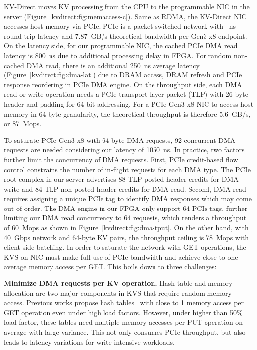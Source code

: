 KV-Direct moves KV processing from the CPU to the programmable NIC in the server (Figure~\ref{kvdirect:fig:memaccess-c}).
Same as RDMA, the KV-Direct NIC accesses host memory via PCIe. PCIe is a packet switched network with ~ns round-trip latency and 7.87~GB/s theoretical bandwidth per Gen3 x8 endpoint.
On the latency side, for our programmable NIC, the cached PCIe DMA read latency is 800~ns due to additional processing delay in FPGA.
For random non-cached DMA read, there is an additional 250~ns average latency (Figure~\ref{kvdirect:fig:dma-lat}) due to DRAM access, DRAM refresh and PCIe response reordering in PCIe DMA engine.
On the throughput side, each DMA read or write operation needs a PCIe transport-layer packet (TLP) with 26-byte header and padding for 64-bit addressing.
For a PCIe Gen3 x8 NIC to access host memory in 64-byte granularity, the theoretical throughput is therefore 5.6~GB/s, or 87~Mops.

To saturate PCIe Gen3 x8 with 64-byte DMA requests, 92 concurrent DMA requests are needed considering our latency of 1050~ns.
In practice, two factors further limit the concurrency of DMA requests.
First, PCIe credit-based flow control constrains the number of in-flight requests for each DMA type. The PCIe root complex in our server advertises 88 TLP posted header credits for DMA write and 84 TLP non-posted header credits for DMA read.
Second, DMA read requires assigning a unique PCIe tag to identify DMA responses which may come out of order.
The DMA engine in our FPGA only support 64 PCIe tags, further limiting our DMA read concurrency to 64 requests, which renders a throughput of 60~Mops as shown in Figure~\ref{kvdirect:fig:dma-tput}.
On the other hand, with 40~Gbps network and 64-byte KV pairs, the throughput ceiling is 78~Mops with client-side batching.
In order to saturate the network with GET operations, the KVS on NIC must make full use of PCIe bandwidth and achieve close to one average memory access per GET.
This boils down to three challenges:

\textbf{Minimize DMA requests per KV operation.}
Hash table and memory allocation are two major components in KVS that require random memory access.
Previous works propose hash tables~\cite{dragojevic2014farm, breslow2016horton} with close to 1 memory access per GET operation even under high load factors.
However, under higher than 50\% load factor, these tables need multiple memory accesses per PUT operation on average with large variance.
This not only consumes PCIe throughput, but also leads to latency variations for write-intensive workloads.

